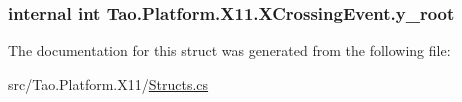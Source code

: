 \label{struct_tao_1_1_platform_1_1_x11_1_1_x_crossing_event_aa3d845a0b14afde204e4af7add83e786}
\hypertarget{struct_tao_1_1_platform_1_1_x11_1_1_x_crossing_event_a662ea55dc8f331015ba917548f717ea0}{
\subsubsection[{y\_\-root}]{\setlength{\rightskip}{0pt plus 5cm}internal int {\bf Tao.Platform.X11.XCrossingEvent.y\_\-root}}}
\label{struct_tao_1_1_platform_1_1_x11_1_1_x_crossing_event_a662ea55dc8f331015ba917548f717ea0}


The documentation for this struct was generated from the following file:\begin{DoxyCompactItemize}
\item 
src/Tao.Platform.X11/\hyperlink{_structs_8cs}{Structs.cs}\end{DoxyCompactItemize}
